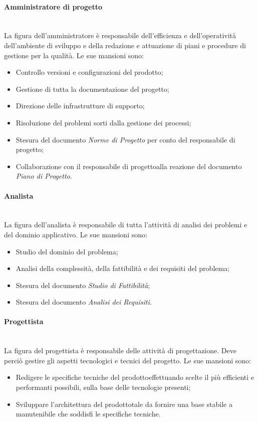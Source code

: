 			\paragraph{Amministratore di progetto}\mbox{}\\ [1mm]
				La figura dell'amministratore è responsabile dell'efficienza e dell'operatività dell'ambiente di sviluppo e della redazione e attuazione di piani e procedure di gestione per la qualità.
				Le sue mansioni sono:
				\begin{itemize}
					\item Controllo versioni e configurazioni del prodotto\glo;
					\item Gestione di tutta la documentazione del progetto\glo;
					\item Direzione delle infrastrutture di supporto;
					\item Risoluzione del problemi sorti dalla gestione dei processi;
					\item Stesura del documento \textit{Norme di Progetto} per conto del responsabile di progetto\glo;
					\item Collaborazione con il responsabile di progetto\glo alla reazione del documento \textit{Piano di Progetto}.
				\end{itemize}
			\paragraph{Analista}\mbox{}\\ [1mm]
				La figura dell'analista è responsabile di tutta l'attività di analisi dei problemi e del dominio applicativo.
				Le sue mansioni sono:
				\begin{itemize}
					\item Studio del dominio del problema;
					\item Analisi della complessità, della fattibilità e dei requisiti del problema;
					\item Stesura del documento \textit{Studio di Fattibilità};
					\item Stesura del documento \textit{Analisi dei Requisiti}.
				\end{itemize}
			\paragraph{Progettista}\mbox{}\\ [1mm]
				La figura del progettista è responsabile delle attività di progettazione\glo. Deve perciò gestire gli aspetti tecnologici e tecnici del progetto.
				Le sue mansioni sono:
				\begin{itemize}
					\item Redigere le specifiche tecniche del prodotto\glosp effettuando scelte il più efficienti e performanti possibili, sulla base delle tecnologie presenti;
					\item Sviluppare l'architettura del prodotto\glosp tale da fornire una base stabile a manutenibile che soddisfi le specifiche tecniche.
				\end{itemize}

